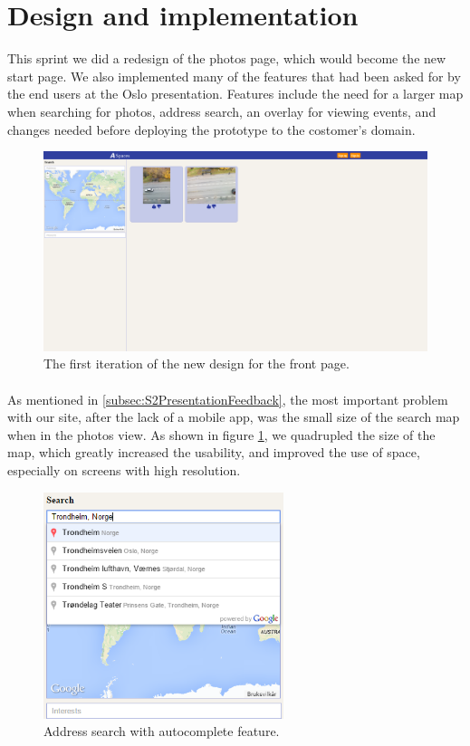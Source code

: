\section{Design and implementation}
\label{sec:S5DesignImpl}

This sprint we did a redesign of the photos page, which would become the new start page. We also implemented many of the features that had been asked for by the end users at the Oslo presentation. Features include the need for a larger map when searching for photos, address search, an overlay for viewing events, and changes needed before deploying the prototype to the costomer's domain.

\begin{figure}[ht!]
  \centering
  \includegraphics[width=\linewidth]{./img/webpage/27Oct/Frontpage27Oct}
  \caption{The first iteration of the new design for the front page.}
  \label{fig:S5DesignImplFront27Oct}
\end{figure}

\paragraph{} As mentioned in \ref{subsec:S2PresentationFeedback}, the most important problem with our site, after the lack of a mobile app, was the small size of the search map when in the photos view. As shown in figure \ref{fig:S5DesignImplFront27Oct}, we quadrupled the size of the map, which greatly increased the usability, and improved the use of space, especially on screens with high resolution.

\begin{figure}[ht!]
  \centering
  \includegraphics[width=70mm]{./img/webpage/27Oct/AddressAutocomplete.png}
  \caption{Address search with autocomplete feature.}
  \label{fig:S5DesignImplAddressAuto}
\end{figure}

